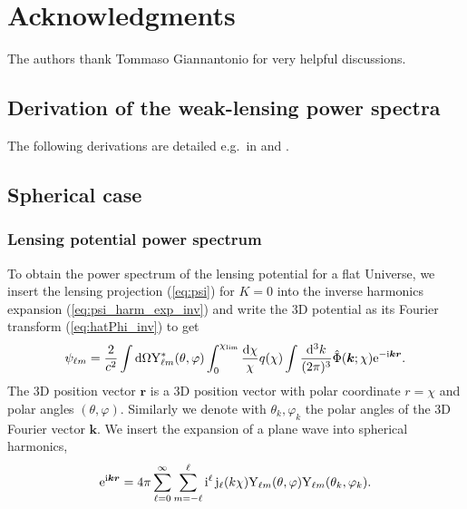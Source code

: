 \documentclass[fleqn,usenatbib]{mnras} %
\renewcommand{\vec}{\bm}
\begin{document}
\section*{Acknowledgments}

The authors thank Tommaso Giannantonio for very helpful discussions.




\begin{appendix}

\section{Derivation of the weak-lensing power spectra}
\label{sec:derivations_C}

The following derivations are detailed e.g.~in \cite{2000PhRvD..62d3007H} and
\cite{2005PhRvD..72b3516C}.

\subsection{Spherical case}

\subsubsection{Lensing potential power spectrum}

To obtain the power spectrum of the lensing potential for a flat Universe, 
we insert the lensing projection (\ref{eq:psi}) for $K=0$ into the
inverse harmonics expansion (\ref{eq:psi_harm_exp_inv}) and write the 3D potential
as its Fourier transform (\ref{eq:hatPhi_inv}) to get
%
\begin{equation}
  \psi_{\ell m} = \frac 2 {c^2} \int {\rm d} \Omega {\rm Y}^\ast_{\ell m}(\theta, \varphi)
    \int_0^{\chi_{\rm lim}} \frac{{\rm d}\chi}{\chi} q(\chi) \int \frac{{\rm d}^3 k}{(2\pi)^3} \hat \Phi(\vec k; \chi) {\rm e}^{-{\rm i} \vec k \vec r}.
\end{equation}
%
The 3D position vector $\vec r$ is a 3D position vector with polar coordinate
$r = \chi$ and polar angles $(\theta, \varphi)$. Similarly we denote with
$\theta_k, \varphi_k$ the polar angles of the 3D Fourier vector $\vec k$. We
insert the expansion of a plane wave into spherical harmonics,
%
%
\begin{equation}
  {\rm e}^{{\rm i} \vec k \vec r} = 4 \pi \sum_{\ell=0}^{\infty} \sum_{m=-\ell}^{\ell}
    {\rm i}^\ell \, {\rm j}_\ell(k \chi)
    {\rm Y}_{\ell m}(\theta, \varphi) {\rm Y}_{\ell m}(\theta_k, \varphi_k) .
  \label{eq:wave_exp}
\end{equation}
%


\end{appendix}
\end{document}
